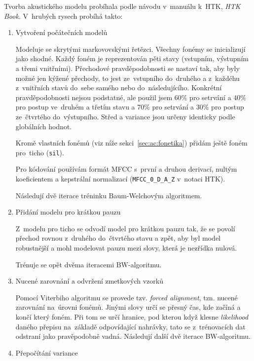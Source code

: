Tvorba akustického modelu probíhala podle návodu v~manuálu k~HTK, \textit{HTK
Book}. V~hrubých rysech probíhá takto:

\begin{enumerate}

\item{Vytvoření počátečních modelů}

Modeluje se skrytými markovovskými řetězci. Všechny fonémy se inicializují jako
shodné. Každý foném je reprezentován pěti stavy (vstupním, výstupním a třemi
vnitřními). Přechodové pravděpodobnosti se nastaví tak, aby byly možné jen
kýžené přechody, to jest ze~vstupního do~druhého a z~každéhu z~vnitřních stavů
do~sebe samého nebo do~následujícího. Konkrétní pravděpodobnosti nejsou
podstatné, ale použil jsem 60\% pro setrvání a 40\% pro postup ve~druhém a
třetím stavu a 70\% pro setrvání a 30\% pro postup ze~čtvrtého do~výstupního.
Střed a variance jsou určeny identicky podle globálních hodnot.

Kromě vlastních fonémů (viz níže sekci~\ref{sec:ac:fonetika}) přidám ještě foném
pro~ticho (\texttt{sil}).

Pro kódování používám formát MFCC s~první a druhou derivací, nultým koeficientem
a kepstrální normalizací (\texttt{MFCC\_0\_D\_A\_Z} v~notaci HTK).

Následují dvě iterace tréninku Baum-Welchovým algoritmem\cite{welch2003hidden}.

\item{Přidání modelu pro krátkou pauzu}

Z~modelu pro ticho se odvodí model pro krátkou pauzu tak, že se povolí přechod
rovnou z~druhého do~čtvrtého stavu a zpět, aby byl model robustnější a mohl
modelovat pauzu mezi slovy, která je nezřídka nulová.

Trénuje se opět dvěma iteracemi BW-algoritmu.

\item{Nucené zarovnání a odvržení zmetkových vzorků}

Pomocí Viterbiho algoritmu\cite{forney1973viterbi} se provede tzv.
\textit{forced alignment}, tzn. nucené zarovnání na~úrovni fonémů. Jinými slovy
určí se přesný čas, kde začíná a končí který foném. Při tom se určí hranice, pod
kterou když klesne \textit{likelihood} daného přepisu na~základě odpovídající
nahrávky, tato se z~trénovacích dat odstraní jako pravěpodobně vadná. Následují
další dvě iterace BW-algoritmu.

\item{Přepočítání variance}


\end{enumerate}
